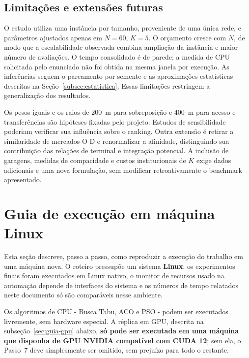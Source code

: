 \documentclass[12pt,a4paper]{article}
\begin{document}
\subsection{Limitações e extensões futuras}

O estudo utiliza uma instância por tamanho, proveniente de uma única rede,
e parâmetros ajustados apenas em $N=60$, $K=5$. O orçamento cresce com $N$,
de modo que a escalabilidade observada combina ampliação da instância e maior
número de avaliações. O tempo consolidado é de parede; a medida de CPU
solicitada pelo enunciado não foi obtida na mesma janela por execução.
As inferências seguem o pareamento por semente e as aproximações estatísticas
descritas na Seção~\ref{subsec:estatistica}. Essas limitações restringem a
generalização dos resultados.

Os pesos iguais e os raios de 200~m para sobreposição e 400~m para acesso
e transferências são hipóteses fixadas pelo projeto. Estudos de sensibilidade
poderiam verificar sua influência sobre o ranking. Outra extensão é retirar
a similaridade de mercados O-D e renormalizar a afinidade, distinguindo sua
contribuição das relações de terminal e integração potencial. A inclusão de
garagens, medidas de compacidade e custos institucionais de $K$ exige dados
adicionais e uma nova formulação, sem modificar retroativamente o benchmark
apresentado.

\clearpage
{}
{}



\clearpage
\appendix

\clearpage

\section{Guia de execução em máquina Linux}
\label{sec:guia-execucao}

Esta seção descreve, passo a passo, como reproduzir a execução do
trabalho em uma máquina nova. O roteiro pressupõe um sistema
\textbf{Linux}: os experimentos finais foram executados em Linux nativo,
o monitor de recursos usado na automação depende de interfaces do sistema
e os números de tempo relatados neste documento só são comparáveis nesse
ambiente.

Os algoritmos de CPU - Busca Tabu, ACO e PSO - podem ser executados
livremente, sem hardware especial. A réplica em GPU, descrita na
subseção~\ref{sec:guia-gpu} abaixo, \textbf{só pode ser executada em uma
máquina que disponha de GPU NVIDIA compatível com CUDA 12}; sem ela, o
Passo~7 deve simplesmente ser omitido, sem prejuízo para todo o restante.
\end{document}
